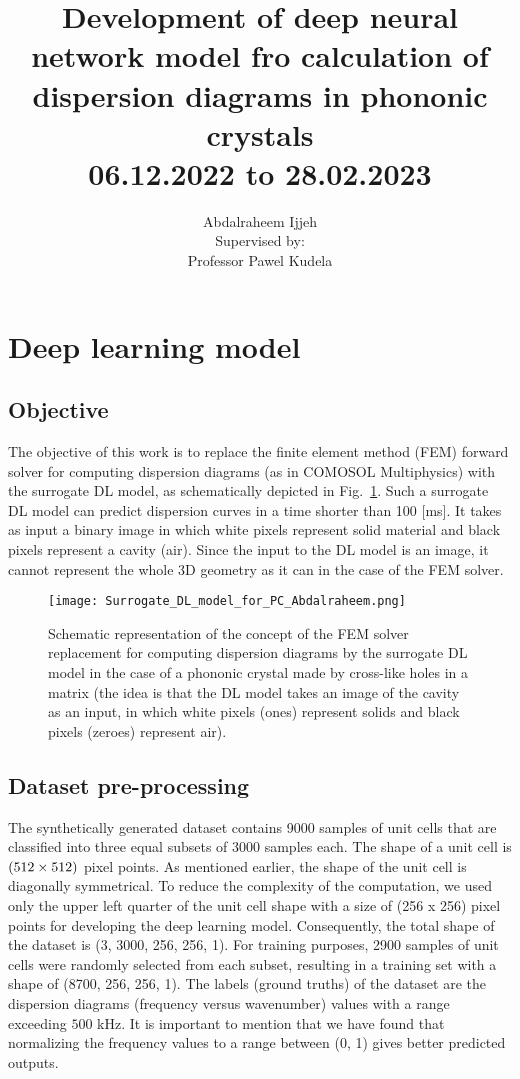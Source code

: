 \documentclass[11pt,a4paper]{report}
\author{Abdalraheem Ijjeh \\
	Supervised by: \\
	Professor Pawel Kudela}
\title{\Huge Development of deep neural network model fro calculation of dispersion diagrams in phononic crystals\\
	\huge 06.12.2022 to 28.02.2023}
\begin{document}
	\maketitle
	\tableofcontents
	\newpage
	
	\begin{sloppypar}
		\section{Deep learning model}		
		\subsection{Objective}
		The objective of this work is to replace the finite element method (FEM) forward solver for computing dispersion diagrams (as in COMOSOL Multiphysics) with the surrogate DL model, as schematically depicted in Fig.~\ref{fig:DL_vs_FEM}. 
		Such a surrogate DL model can predict dispersion curves in a time shorter than 100 [ms]. 
		It takes as input a binary image in which white pixels represent solid material and black pixels represent a cavity (air). 
		Since the input to the DL model is an image, it cannot represent the whole 3D geometry as it can in the case of the FEM solver. 		
		\begin{figure}[ht!]
			\centering
			\texttt{[image: Surrogate\_DL\_model\_for\_PC\_Abdalraheem.png]}
			\caption{Schematic representation of the concept of the FEM solver replacement for computing dispersion diagrams by the surrogate DL model in the case of a phononic crystal made by cross-like holes in a matrix (the idea is that the DL model takes an image of the cavity as an input, in which white pixels (ones) represent solids and black pixels (zeroes) represent air).}
			\label{fig:DL_vs_FEM}
		\end{figure}
		
		\subsection{Dataset pre-processing}
		\noindent 		
		The synthetically generated dataset contains 9000 samples of unit cells that are classified into three equal subsets of 3000 samples each.
		The shape of a unit cell is \((\textup{512}\times \textup{512})\) pixel points.
		As mentioned earlier, the shape of the unit cell is diagonally symmetrical.
		To reduce the complexity of the computation, we used only the upper left quarter of the unit cell shape with a size of (256 x 256) pixel points for developing the deep learning model.
		Consequently, the total shape of the dataset is (3, 3000, 256, 256, 1).
		For training purposes, 2900 samples of unit cells were randomly selected from each subset, resulting in a training set with a shape of (8700, 256, 256, 1).
		The labels (ground truths) of the dataset are the dispersion diagrams (frequency versus wavenumber) values with a range exceeding \(500\) kHz.
		It is important to mention that we have found that normalizing the frequency values to a range between (0, 1) gives better predicted outputs.

\end{sloppypar}
\end{document}
